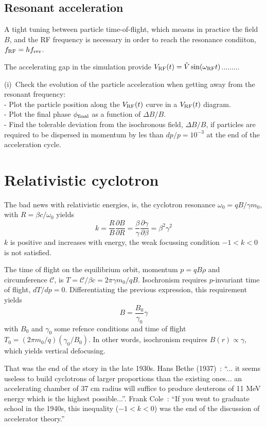 \subsection{Resonant acceleration}

A tight tuning between particle time-of-flight, which measns in practice the 
field $B$, and the RF frequency is necessary in order to reach the 
resonance condiiton, $f_{\rm RF} = h f_{\rm rev}$.

The accelerating gap in the simulation provide $V_{\rm RF}(t) = \hat V \sin (\omega_{\rm RF} t)$......... 

(i)~Check the evolution of the particle acceleration when 
 getting away from the resonant frequency: \\
- Plot the particle position along the $V_{\rm RF}(t)$ curve in a $V_{\rm RF}(t)$ diagram. \\
- Plot the final phase $\phi_{\rm final}$ as a function of $\Delta B/B$. \\
- Find the tolerable deviation from the isochronous field, 
$\Delta B/B$,  if particles are required to be dispersed in momentum by les 
than $dp/p=10^{-3}$ at the end of the acceleration cycle.




\section{Relativistic cyclotron \label{secCycloRel}}

The bad news with relativistic energies, is, 
the cyclotron resonance $\omega_0 = qB/\gamma m_0$, with $R = \beta c / \omega_0$  yields  
       $$k = \frac{R}{B}\frac{\partial B}{\partial R} = \frac{\beta}{\gamma} 
  \frac{\partial \gamma}{\partial \beta} = \beta^2 \gamma^2 $$
$k$ is positive and increases with energy, 
 the weak focussing condition $-1<k<0$ is not satisfied. 

The time of flight on the equilibrium orbit, momentum $p = qB\rho$ and circumference $\mathcal{C}$, is 
$T =  \mathcal{C}/ \beta c = 2\pi \gamma m_0 / qB$. 
    Isochronism requires $p$-invariant time of flight, $dT/dp=0$. Differentiating the previous expression,
this requirement yields 
$$B = \frac{B_0}{\gamma_0} \gamma$$
with $B_0$ and $\gamma_0$  some refence conditions and time of flight $T_0 = (2\pi m_0/q)(\gamma_0/B_0)$.
In other words, isochronism requires $ B(r) \propto \gamma$, which yields vertical defocusing. 

That was the end of the story in the late 1930s. 
Hans Bethe (1937)~: 
``... it seems useless to build cyclotrons of larger proportions than the  
existing ones... an accelerating chamber of 37 cm radius will  suffice to 
produce deuterons of 11 MeV energy which is the highest possible...''. 
Frank Cole~: ``If you went to graduate school in the 1940s, this inequality ($−1 <
k < 0$) was the end of the discussion of accelerator theory.''

